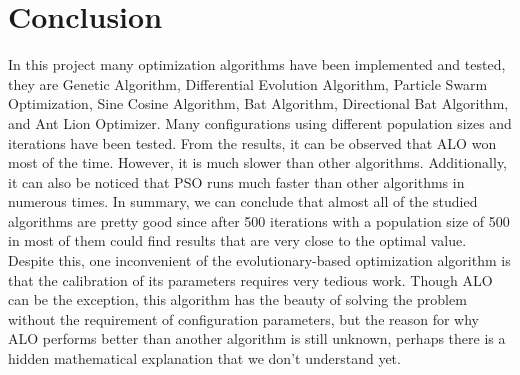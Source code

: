 \documentclass[12pt]{article}
\begin{document}
    \section{Conclusion}



    In this project many optimization algorithms have been implemented and tested, they are Genetic Algorithm, Differential Evolution Algorithm, Particle Swarm Optimization, Sine Cosine Algorithm, Bat Algorithm, Directional Bat Algorithm, and Ant Lion Optimizer. Many configurations using different population sizes and iterations have been tested. From the results, it can be observed that ALO won most of the time. However, it is much slower than other algorithms.
    Additionally, it can also be noticed that PSO runs much faster than other algorithms in numerous times. 
    In summary, we can conclude that almost all of the studied algorithms are pretty good since after 500 iterations with a population size of 500 in most of them could find results that are very close to the optimal value. Despite this, one inconvenient of the evolutionary-based optimization algorithm is that the calibration of its parameters requires very tedious work. Though ALO can be the exception, this algorithm has the beauty of solving the problem without the requirement of configuration parameters, but the reason for why ALO performs better than another algorithm is still unknown, perhaps there is a hidden mathematical explanation that we don't understand yet.



\end{document}
